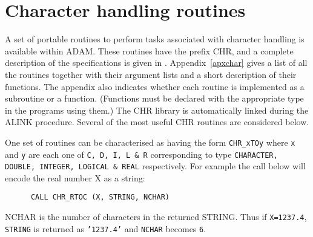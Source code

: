 \newpage
\section{Character handling routines\label{char}}

A set of portable routines to perform tasks associated with 
character handling is available within ADAM.
These routines have the prefix CHR, and a complete description of the 
specifications is given in .
Appendix~\ref{apxchar} gives a list of all the routines together with 
their argument lists and a short description of their functions.
The appendix also indicates
whether  each routine is implemented as a subroutine or a function.
(Functions must be declared with the appropriate type in the programs using 
them.)
The CHR library is automatically linked during the ALINK procedure.
Several of the most useful CHR routines are considered below.

One set of routines can be characterised as having the form
{\tt CHR\_xTOy} where {\tt x} and {\tt y} are each  one  
of {\tt C, D, I, L \& R} corresponding to type
{\tt CHARACTER, DOUBLE, INTEGER, LOGICAL \& REAL} respectively.
For example the call below will encode the  real number X as a string:
\begin{verbatim}
      CALL CHR_RTOC (X, STRING, NCHAR)
\end{verbatim}
NCHAR is the number of characters in the returned STRING.
Thus if {\tt X=1237.4}, {\tt STRING} is returned as {\tt'1237.4'} 
and {\tt NCHAR} becomes {\tt 6}.


